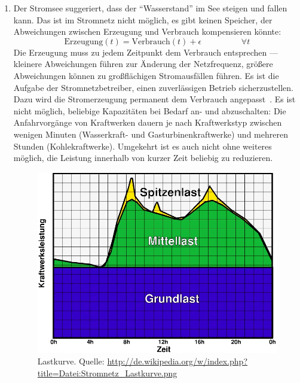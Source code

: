 \documentclass[12pt,BCOR=8.5mm]{scrartcl}
\begin{document}
\begin{enumerate}
  \item Der Stromsee suggeriert, dass der "`Wasserstand"' im See steigen
    und fallen kann. Das ist im Stromnetz nicht möglich, es gibt keinen
    Speicher, der Abweichungen zwischen Erzeugung und Verbrauch
    kompensieren könnte:
    \begin{equation}
      \textrm{Erzeugung}(t) = \textrm{Verbrauch}(t) + \epsilon \hspace{2cm} \forall t
    \end{equation}
    Die Erzeugung muss zu jedem Zeitpunkt dem Verbrauch entsprechen ---
    kleinere Abweichungen führen zur Änderung der Netzfrequenz, größere
    Abweichungen können zu großflächigen Stromausfällen führen. Es
    ist die Aufgabe der Stromnetzbetreiber, einen zuverlässigen Betrieb sicherzustellen. Dazu
    wird die Stromerzeugung permanent dem Verbrauch
    angepasst~\cite{wikipedia10kraftwerksmanagement}. Es
    ist nicht möglich, beliebige Kapazitäten bei Bedarf an- und
    abzuschalten: Die Anfahrvorgänge von Kraftwerken dauern je nach
    Kraftwerkstyp zwischen wenigen Minuten (Wasserkraft- und
    Gasturbinenkraftwerke) und mehreren Stunden (Kohlekraftwerke). Umgekehrt
    ist es auch nicht ohne weiteres möglich, die Leistung innerhalb von
    kurzer Zeit beliebig zu reduzieren. 

    \begin{figure}[htbp]
      \begin{center}
        \includegraphics[width=12cm]{figures/Stromnetz_Lastkurve.png}
        \caption{Lastkurve. Quelle: \url{http://de.wikipedia.org/w/index.php?title=Datei:Stromnetz_Lastkurve.png}}
        \label{fig:stromnetz_lastkurve}
      \end{center}
    \end{figure}
    

\end{enumerate}
\end{document}
